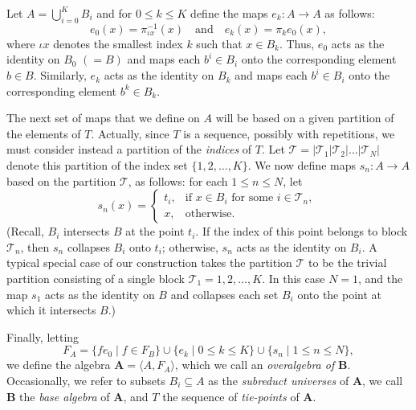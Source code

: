 \documentclass{au}
\numberwithin{equation}{section}
\theoremstyle{plain}
\theoremstyle{definition}
\newcommand{\suchthat}{\ensuremath{\mid}}  %
\newcommand{\defeq}{\ensuremath{=}}        %
\newcommand{\<}{\ensuremath{\langle}}
\renewcommand{\>}{\ensuremath{\rangle}}
\newcommand{\bA}{\ensuremath{\mathbf{A}}}
\newcommand{\bB}{\ensuremath{\mathbf{B}}}
\newcommand{\sT}{\ensuremath{\mathscr{T}}}
\renewcommand{\leq}{\ensuremath{\leqslant}}
\begin{document}
Let $A = \bigcup_{i=0}^K B_i$ and for $0\leq k \leq K$ define the maps
$e_k\colon A\rightarrow A$ as follows:
\[
e_0(x) = \pi^{-1}_{\iota x}(x) \quad\text{and}\quad
e_k(x)=\pi_k e_0(x),
\]
where $\iota x$ denotes the smallest index $k$ such that $x\in
B_k$. %
Thus, $e_0$ acts as the identity on 
$B_0$ $(= B)$ and maps each
$b^i\in B_i$ onto the corresponding element $b\in B$.
Similarly, $e_k$ acts as the identity on $B_k$ and maps each
$b^i\in B_i$ onto the corresponding element $b^k\in B_k$.

The next set of maps that we define on $A$ will be based on a given partition of the
elements of $T$.  Actually, since $T$ is a sequence, possibly with repetitions,
we must consider instead a partition  of
the \emph{indices} of $T$.  Let $\sT = |\sT_1|\sT_2|\dots|\sT_N|$ denote this
partition of the index set $\{1, 2, \dots, K\}$.
We now define maps $s_n \colon  A\rightarrow A$
based on the partition $\sT$, as follows: for each $1\leq n\leq N$, let
\begin{equation}
  \label{fn:s_n}
s_n(x) =
 \begin{cases}
   t_i, & \text{if $x \in B_i$ for some $i \in \sT_n$, }\\
   x, & \text{otherwise}.
 \end{cases}
\end{equation}
(Recall, $B_i$ intersects $B$ at the point $t_i$. If the index of this point
belongs to block $\sT_n$, then $s_n$ collapses $B_i$ onto $t_i$; otherwise,
$s_n$ acts as the identity on $B_i$.  A typical special case of our
construction takes the partition $\sT$ to be the trivial
partition consisting of a single block $\sT_1 = 1,2,\dots,K$.  In this case
$N=1$, and the map $s_1$ acts as the identity on $B$ and collapses each set $B_i$
onto the point at which it intersects $B$.)

Finally, letting
\[
F_A \defeq  \{f e_0 \suchthat f\in F_B\} \cup \{e_k \suchthat 0\leq k \leq K\} \cup \{s_n \suchthat 1 \leq n
\leq N\},
\]
we define the algebra $\bA \defeq  \< A, F_A\>$, which we call
an \emph{overalgebra of} $\bB$.
Occasionally, we refer to subsets $B_i\subseteq A$ as the \emph{subreduct
  universes} of $\bA$, we call $\bB$ the
\emph{base algebra} of $\bA$, and $T$ the sequence of \emph{tie-points} of $\bA$.
\end{document}
